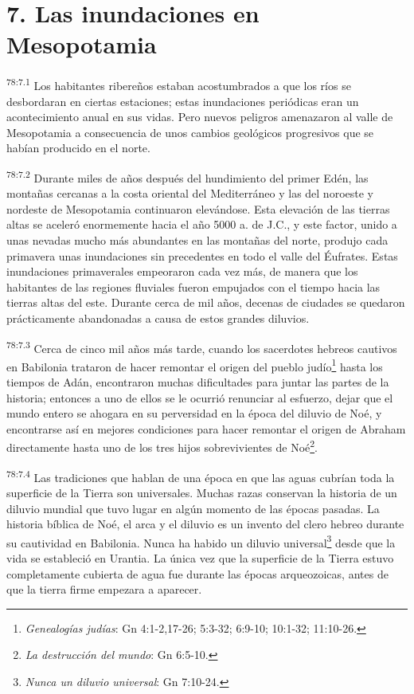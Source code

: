 \section*{7. Las inundaciones en Mesopotamia}
\par
\textsuperscript{78:7.1} Los habitantes ribereños estaban acostumbrados a que los ríos se desbordaran en ciertas estaciones; estas inundaciones periódicas eran un acontecimiento anual en sus vidas. Pero nuevos peligros amenazaron al valle de Mesopotamia a consecuencia de unos cambios geológicos progresivos que se habían producido en el norte.

\par
\textsuperscript{78:7.2} Durante miles de años después del hundimiento del primer Edén, las montañas cercanas a la costa oriental del Mediterráneo y las del noroeste y nordeste de Mesopotamia continuaron elevándose. Esta elevación de las tierras altas se aceleró enormemente hacia el año 5000 a. de J.C., y este factor, unido a unas nevadas mucho más abundantes en las montañas del norte, produjo cada primavera unas inundaciones sin precedentes en todo el valle del Éufrates. Estas inundaciones primaverales empeoraron cada vez más, de manera que los habitantes de las regiones fluviales fueron empujados con el tiempo hacia las tierras altas del este. Durante cerca de mil años, decenas de ciudades se quedaron prácticamente abandonadas a causa de estos grandes diluvios.

\par
\textsuperscript{78:7.3} Cerca de cinco mil años más tarde, cuando los sacerdotes hebreos cautivos en Babilonia trataron de hacer remontar el origen del pueblo judío\footnote{\textit{Genealogías judías}: Gn 4:1-2,17-26; 5:3-32; 6:9-10; 10:1-32; 11:10-26.} hasta los tiempos de Adán, encontraron muchas dificultades para juntar las partes de la historia; entonces a uno de ellos se le ocurrió renunciar al esfuerzo, dejar que el mundo entero se ahogara en su perversidad en la época del diluvio de Noé, y encontrarse así en mejores condiciones para hacer remontar el origen de Abraham directamente hasta uno de los tres hijos sobrevivientes de Noé\footnote{\textit{La destrucción del mundo}: Gn 6:5-10.}.

\par
\textsuperscript{78:7.4} Las tradiciones que hablan de una época en que las aguas cubrían toda la superficie de la Tierra son universales. Muchas razas conservan la historia de un diluvio mundial que tuvo lugar en algún momento de las épocas pasadas. La historia bíblica de Noé, el arca y el diluvio es un invento del clero hebreo durante su cautividad en Babilonia. Nunca ha habido un diluvio universal\footnote{\textit{Nunca un diluvio universal}: Gn 7:10-24.} desde que la vida se estableció en Urantia. La única vez que la superficie de la Tierra estuvo completamente cubierta de agua fue durante las épocas arqueozoicas, antes de que la tierra firme empezara a aparecer.

